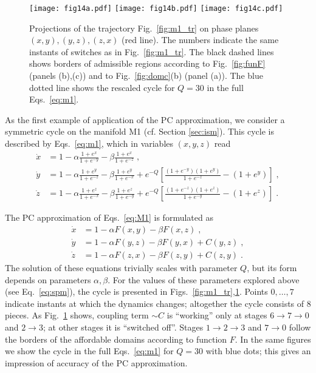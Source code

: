 \documentclass[3p,number,review,sort&compress]{elsarticle}
\begin{document}
\begin{figure}[!htb]
\centering
\texttt{[image: fig14a.pdf]}\hfill
\texttt{[image: fig14b.pdf]}\hfill
\texttt{[image: fig14c.pdf]}
\caption{Projections of the trajectory Fig.~\ref{fig:m1_tr}
on phase planes $(x,y),(y,z),(z,x)$ (red line). The numbers indicate the same 
instants of switches as in Fig.~\ref{fig:m1_tr}. The black dashed lines shows
borders of admissible regions according to Fig.~\ref{fig:funF} (panels (b),(c))
and to Fig.~\ref{fig:domc}(b) (panel (a)). The blue dotted
line shows the rescaled cycle for $Q=30$ in the full Eqs.~\eqref{eq:m1}.}
\label{fig:m1_pp}
\end{figure}

As the first example of application of the PC
approximation, we consider a symmetric cycle on the manifold M1 (cf.
Section \ref{sec:ism}). This cycle is described by Eqs.~\eqref{eq:m1}, which in variables $(x,y,z)$ read
\begin{equation}
\begin{aligned}
\dot x&=1-\alpha \frac{1+e^x}{1+e^{-y}}-\beta \frac{1+e^x}{1+e^{-z}}\;,\\
\dot y&=1-\alpha \frac{1+e^y}{1+e^{-z}}-\beta \frac{1+e^y}{1+e^{-x}}
+e^{-Q}\left[\frac{(1+e^{-y})(1+e^y)}{1+e^{-z}}-(1+e^y)\right]\;,\\
\dot z&=1-\alpha \frac{1+e^z}{1+e^{-x}}-\beta \frac{1+e^z}{1+e^{-y}}
+e^{-Q}\left[\frac{(1+e^{-z})(1+e^z)}{1+e^{-y}}-(1+e^z)\right]\;.
\end{aligned}
\label{eq:M1}
\end{equation}

The PC approximation of Eqs.~\eqref{eq:M1} is formulated as
\begin{equation}
\begin{aligned}
\dot x &=1-\alpha F(x,y) -\beta F(x,z)\;,\\
\dot y&=1-\alpha F(y,z)-\beta F(y,x)+C(y,z)\;,\\
\dot z&=1-\alpha F(z,x)-\beta F(z,y)+C(z,y)\;.
\end{aligned}
\label{eq:csfM1}
\end{equation}
The solution of these equations trivially scales
with parameter $Q$, but its form 
depends on parameters $\alpha,\beta$. For the values
of these parameters explored above (see Eq.~\eqref{eq:spm}), the cycle
is presented in Figs.~\ref{fig:m1_tr},\ref{fig:m1_pp}.
Points $0,\ldots,7$ indicate instants at which the 
dynamics changes; altogether the cycle consists of 8 pieces.
As Fig.~\ref{fig:m1_pp} shows, coupling term $\sim C$
is ``working'' only at stages $6\to 7 \to 0$ and $2\to 3$;
at other stages it is ``switched off''. Stages $1\to 2 \to 3$ and
$7\to 0$ follow the borders of the affordable domains according to function $F$. In the same figures we show the cycle in the full Eqs.~\eqref{eq:m1}
for $Q=30$ with blue dots; this gives an impression of accuracy
of the PC approximation.
\end{document}
